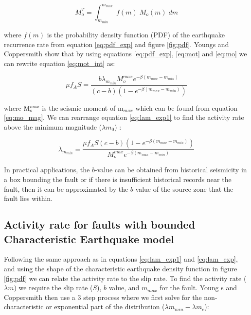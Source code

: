 \begin{enumerate}
\begin{equation} \label{eq:mot_int}
M_o^T = \int_{m_{min}}^{m_{max}} \; f(m) \; M_o(m) \; dm
\end{equation}

where $f(m)$ is the probability density function (PDF) of the earthquake recurrence rate from equation \ref{eq:pdf_exp} and figure \ref{fig:pdf}. 
Youngs and Coppersmith show that by using equations \ref{eq:pdf_exp}, \ref{eq:mot} and \ref{eq:mo} we can rewrite equation \ref{eq:mot_int} as:

\begin{equation} \label{eq:lam_exp1}
\mu f_A S= \frac{ b \lambda _{m_{min}} M_o^{max} e^{- \beta (m_{max} - m_{min} )} }  { (c - b) (1-e^{-\beta (m_{max} - m_{min}) })  }
\end{equation}

where M$_o^{max}$ is the seismic moment of m$_{max}$ which can be found from equation \ref{eq:mo_mag}. We can rearrange equation \ref{eq:lam_exp1} 
to find the activity rate above the minimum magnitude ($\lambda m_0$) :

\begin{equation} \label{eq:lam_exp}
\lambda _{m_{min}} = \frac{ \mu f_A S (c - b) (1-e^{-\beta (m_{max} - m_{min}) }) } { M_o^{max}  e^{- \beta (m_{max} - m_{min} )} }
\end{equation}

In practical applications, the $b$-value can be obtained from historical seismicity in a box bounding the fault \cite{eqrm_Schwartz1984,eqrm_Youngs1985} or if there is 
insufficient historical records near the fault, then it can be approximated by the $b$-value of the source zone that the fault lies within. 

\subsection{Activity rate for faults with bounded Characteristic Earthquake model} 
\label{sec:rv_flt_ch}

Following the same approach as in equations \ref{eq:lam_exp1} and  \ref{eq:lam_exp}, and using the shape of the characteristic 
earthquake density function in figure \ref{fig:pdf} we can relate the activity rate to the slip rate. To find the activity 
rate ($\lambda m$) we require the slip rate ($S$), $b$ value, and $m_{max}$ for the fault. Young s and Coppersmith then use 
a 3 step process where we first solve for the non-characteristic or exponential part of the distribution ($\lambda m_{min} - \lambda m_{c}$):


\end{enumerate}
